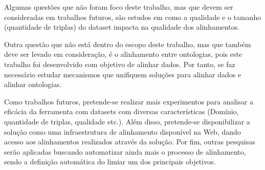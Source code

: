 Algumas questões que não foram foco deste trabalho, mas que devem ser consideradas em trabalhos futuros, são estudos em como a qualidade e o tamanho (quantidade de triplas) do dataset impacta na qualidade dos alinhamentos.

Outra questão que não está dentro do escopo deste trabalho, mas que também deve ser levado em consideração, é o alinhamento entre ontologias, pois este trabalho foi desenvolvido com objetivo de alinhar dados. Por tanto, se faz necessário estudar mecanismos que unifiquem soluções para alinhar dados e alinhar ontologias.

Como trabalhos futuros, pretende-se realizar mais experimentos para analisar a eficácia da ferramenta com datasets com diversas características (Domínio, quantidade de triplas, qualidade etc.). Além disso, pretende-se disponibilizar a solução como uma infraestrutura de alinhamento disponível na Web, dando acesso aos alinhamentos realizados através da solução. Por fim, outras pesquisas serão aplicadas buscando automatizar ainda mais o processo de alinhamento, sendo a definição automática do limiar um dos principais objetivos.

